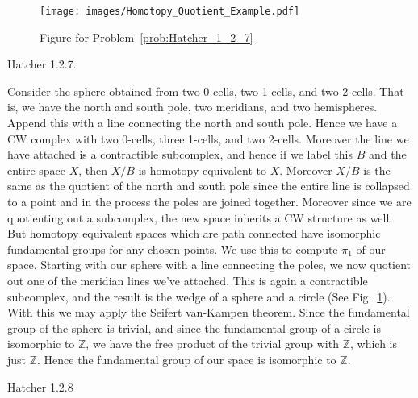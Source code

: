 \documentclass{book}                                                           %
\begin{document}
\begin{figure}[H]
    \centering
    \captionsetup{type=figure}
    \texttt{[image: images/Homotopy\_Quotient\_Example.pdf]}
    \caption{Figure for Problem~\ref{prob:Hatcher_1_2_7}}
    \label{fig:Fig_Prob_Hatcher_1_2_7}
\end{figure}
\begin{problem}
    \label{prob:Hatcher_1_2_7}%
    Hatcher 1.2.7.
\end{problem}
\begin{solution}
    Consider the sphere obtained from two 0-cells, two 1-cells, and two
    2-cells. That is, we have the north and south pole, two meridians, and
    two hemispheres. Append this with a line connecting the north and south
    pole. Hence we have a CW complex with two 0-cells, three
    1-cells, and two 2-cells. Moreover the line we have attached is a
    contractible subcomplex, and hence if we label this $B$ and the entire
    space $X$, then $X/B$ is homotopy equivalent to $X$. Moreover $X/B$ is
    the same as the quotient of the north and south pole since the entire
    line is collapsed to a point and in the process the poles are joined
    together. Moreover since we are quotienting out a subcomplex, the new
    space inherits a CW structure as well. But homotopy equivalent spaces
    which are path connected have isomorphic fundamental groups for any
    chosen points. We use this to compute $\pi_{1}$ of our space. Starting
    with our sphere with a line connecting the poles, we now quotient out
    one of the meridian lines we've attached. This is again a contractible
    subcomplex, and the result is the wedge of a sphere and a circle
    (See Fig.~\ref{fig:Fig_Prob_Hatcher_1_2_7}). With this we may apply the
    Seifert van-Kampen theorem. Since the fundamental group of the sphere is
    trivial, and since the fundamental group of a circle is isomorphic to
    $\mathbb{Z}$, we have the free product of the trivial group with
    $\mathbb{Z}$, which is just $\mathbb{Z}$. Hence the fundamental group of
    our space is isomorphic to $\mathbb{Z}$.
\end{solution}
\begin{problem}
    \label{prob:Hatcher_1_2_8}%
    Hatcher 1.2.8
\end{problem}
\end{document}
